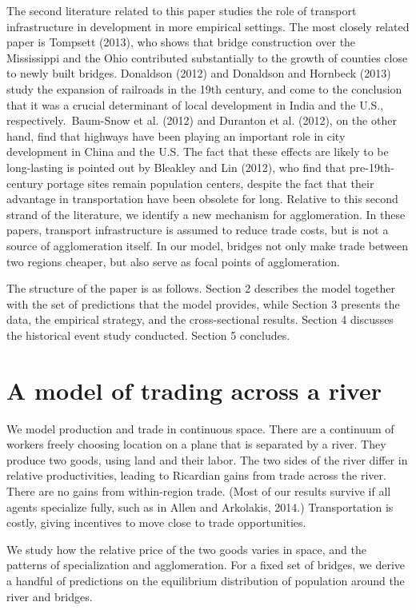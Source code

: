 \documentclass[12pt]{article}
\begin{document}
The second literature related to this paper studies the role of transport
infrastructure in development in more empirical settings. The most closely related 
paper is Tompsett (2013), who shows that bridge construction over the Mississippi 
and the Ohio contributed substantially to the growth of counties close to newly 
built bridges. Donaldson (2012) and Donaldson and Hornbeck (2013) study the expansion
of railroads in the 19th century, and come to the conclusion that it was a crucial determinant of local
development in India and the U.S., respectively.\ Baum-Snow et al. (2012)
and Duranton et al. (2012), on the other hand, find that highways have been
playing an important role in city development in China and the U.S. The fact
that these effects are likely to be long-lasting is pointed out by Bleakley
and Lin (2012), who find that pre-19th-century portage sites remain
population centers, despite the fact that their advantage in transportation
have been obsolete for long. Relative to this second strand of the
literature, we identify a new mechanism for agglomeration. In these papers,
transport infrastructure is assumed to reduce trade costs, but is not a
source of agglomeration itself. In our model, bridges not only make trade
between two regions cheaper, but also serve as focal points of agglomeration.

\bigskip 

The structure of the paper is as follows. Section 2 describes the model
together with the set of predictions that the model provides, while Section
3 presents the data, the empirical strategy, and the cross-sectional results. 
Section 4 discusses the historical event study conducted. Section 5 concludes.

\section{A model of trading across a river}

We model production and trade in continuous space. There are a continuum of
workers freely choosing location on a plane that is separated by a river.
They produce two goods, using land and their labor. The two sides of the
river differ in relative productivities, leading to Ricardian gains from
trade across the river. There are no gains from within-region trade. (Most
of our results survive if all agents specialize fully, such as in Allen and
Arkolakis, 2014.) Transportation is costly, giving incentives to move close
to trade opportunities.

We study how the relative price of the two goods varies in space, and the
patterns of specialization and agglomeration. For a fixed set of bridges, we
derive a handful of predictions on the equilibrium distribution of
population around the river and bridges.
\end{document}
